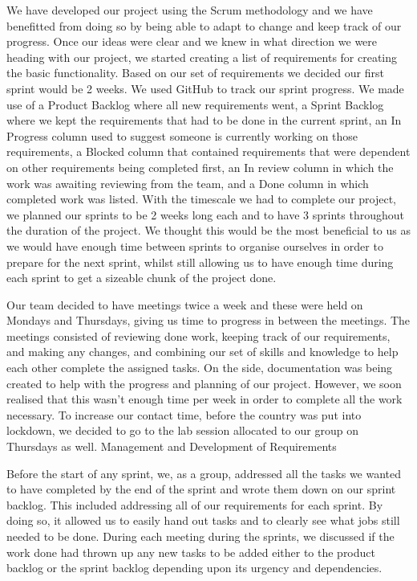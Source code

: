 \documentclass[10pt]{report}
\begin{document}
We have developed our project using the Scrum methodology and we have benefitted from doing so by being able to adapt to change and keep track of our progress. Once our ideas were clear and we knew in what direction we were heading with our project, we started creating a list of requirements for creating the basic functionality. Based on our set of requirements we decided our first sprint would be 2 weeks. We used GitHub to track our sprint progress. We made use of a Product Backlog where all new requirements went, a Sprint Backlog where we kept the requirements that had to be done in the current sprint, an In Progress column used to suggest someone is currently working on those requirements, a Blocked column that contained requirements that were dependent on other requirements being completed first, an In review column in which the work was awaiting reviewing from the team, and a Done column in which completed work was listed.
With the timescale we had to complete our project, we planned our sprints to be 2 weeks long each and to have 3 sprints throughout the duration of the project. We thought this would be the most beneficial to us as we would have enough time between sprints to organise ourselves in order to prepare for the next sprint, whilst still allowing us to have enough time during each sprint to get a sizeable chunk of the project done. 

Our team decided to have meetings twice a week and these were held on Mondays and Thursdays, giving us time to progress in between the meetings. The meetings consisted of reviewing done work, keeping track of our requirements, and making any changes, and combining our set of skills and knowledge to help each other complete the assigned tasks. On the side, documentation was being created to help with the progress and planning of our project. However, we soon realised that this wasn’t enough time per week in order to complete all the work necessary. To increase our contact time, before the country was put into lockdown, we decided to go to the lab session allocated to our group on Thursdays as well.
Management and Development of Requirements

Before the start of any sprint, we, as a group, addressed all the tasks we wanted to have completed by the end of the sprint and wrote them down on our sprint backlog. This included addressing all of our requirements for each sprint. By doing so, it allowed us to easily hand out tasks and to clearly see what jobs still needed to be done. During each meeting during the sprints, we discussed if the work done had thrown up any new tasks to be added either to the product backlog or the sprint backlog depending upon its urgency and dependencies.
\end{document}
